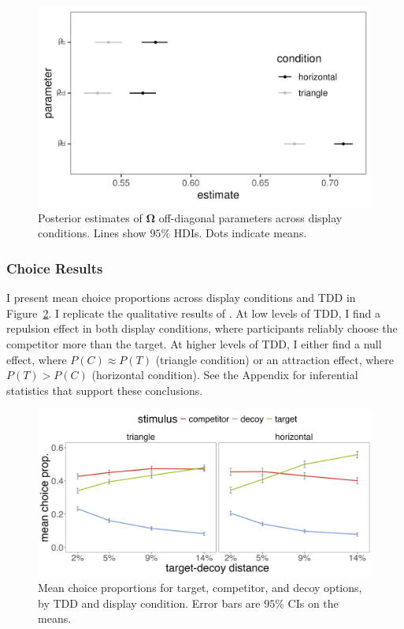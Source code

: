 \begin{figure}
   \includegraphics[width=\textwidth]{figures/bayes_circle_area_sigma_constant_comp_effect_omega_plot.jpeg}
   \caption{Posterior estimates of $\boldsymbol{\Omega}$ off-diagonal parameters across display conditions. Lines show $95\%$ HDIs.  Dots indicate means.}
   \label{fig:e2_omega}
\end{figure}

\subsubsection{Choice Results}

I present mean choice proportions across display conditions and TDD in Figure~\ref{fig:e2_choiceprops}. I replicate the qualitative results of \textcite{spektorWhenGoodLooks2018b}. At low levels of TDD, I find a repulsion effect in both display conditions, where participants reliably choose the competitor more than the target. At higher levels of TDD, I either find a null effect, where $P(C) \approx P(T)$ (triangle condition) or an attraction effect, where $P(T)>P(C)$ (horizontal condition). See the Appendix for inferential statistics that support these conclusions.

\begin{figure}
   \includegraphics[width=\textwidth]{figures/choicePhase_att_trials_mean_choice_props_collapsed.jpg}
   \caption{Mean choice proportions for target, competitor, and decoy options, by TDD and display condition. Error bars are $95\%$ CIs on the means.}
   \label{fig:e2_choiceprops}
\end{figure}


